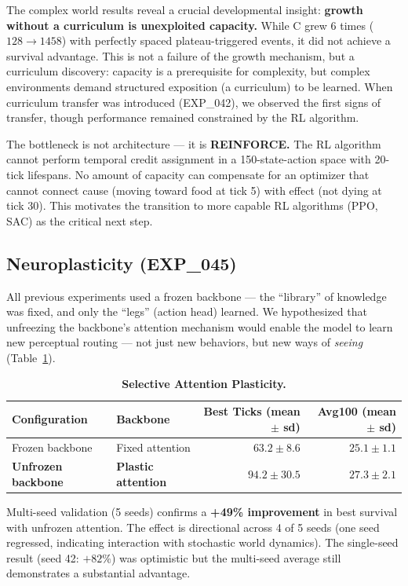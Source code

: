 \documentclass{article}
\begin{document}
The complex world results reveal a crucial developmental insight: \textbf{growth without a curriculum is unexploited capacity.} While C grew 6 times ($128\rightarrow1458$) with perfectly spaced plateau-triggered events, it did not achieve a survival advantage. This is not a failure of the growth mechanism, but a curriculum discovery: capacity is a prerequisite for complexity, but complex environments demand structured exposition (a curriculum) to be learned. When curriculum transfer was introduced (EXP\_042), we observed the first signs of transfer, though performance remained constrained by the RL algorithm.

The bottleneck is not architecture --- it is \textbf{REINFORCE.} The RL algorithm cannot perform temporal credit assignment in a 150-state-action space with 20-tick lifespans. No amount of capacity can compensate for an optimizer that cannot connect cause (moving toward food at tick 5) with effect (not dying at tick 30). This motivates the transition to more capable RL algorithms (PPO, SAC) as the critical next step.

\subsection{Neuroplasticity (EXP\_045)}
\label{sec:neuroplasticity}
All previous experiments used a frozen backbone --- the ``library'' of knowledge was fixed, and only the ``legs'' (action head) learned. We hypothesized that unfreezing the backbone's attention mechanism would enable the model to learn new perceptual routing --- not just new behaviors, but new ways of \textit{seeing} (Table~\ref{tab:plasticity_results}).

\begin{table}[h]
\centering
\caption{\textbf{Selective Attention Plasticity.}}
\label{tab:plasticity_results}
\begin{tabular}{llrr}
\toprule
\textbf{Configuration} & \textbf{Backbone} & \textbf{Best Ticks (mean $\pm$ sd)} & \textbf{Avg100 (mean $\pm$ sd)} \\
\midrule
Frozen backbone & Fixed attention & $63.2 \pm 8.6$ & $25.1 \pm 1.1$ \\
\textbf{Unfrozen backbone} & \textbf{Plastic attention} & $\mathbf{94.2 \pm 30.5}$ & $\mathbf{27.3 \pm 2.1}$ \\
\bottomrule
\end{tabular}
\end{table}

Multi-seed validation (5 seeds) confirms a \textbf{+49\% improvement} in best survival with unfrozen attention. The effect is directional across 4 of 5 seeds (one seed regressed, indicating interaction with stochastic world dynamics). The single-seed result (seed 42: $+82\%$) was optimistic but the multi-seed average still demonstrates a substantial advantage.
\end{document}
